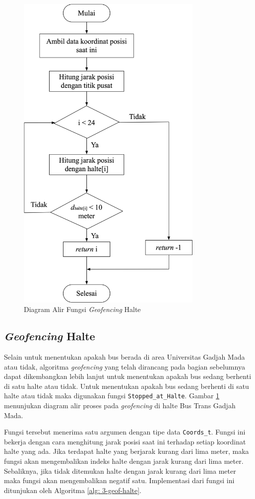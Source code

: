\begin{figure}[H]
	\centering
	\includegraphics[width=9cm]{contents/chapter-3/flowchart-geofencing-halte.png}
	\caption{Diagram Alir Fungsi \textit{Geofencing} Halte}
	\label{Fig: flowchart-geofencing-halte}
\end{figure}

\subsection{\textit{Geofencing} Halte}
Selain untuk menentukan apakah bus berada di area Universitas Gadjah Mada atau tidak, algoritma \textit{geofencing} yang telah dirancang pada bagian sebelumnya dapat dikembangkan lebih lanjut untuk menentukan apakah bus sedang berhenti di satu halte atau tidak. Untuk menentukan apakah bus sedang berhenti di satu halte atau tidak maka digunakan fungsi \texttt{Stopped\_at\_Halte}. Gambar \ref{Fig: flowchart-geofencing-halte} menunjukan diagram alir proses pada \textit{geofencing} di halte Bus Trans Gadjah Mada. 

Fungsi tersebut menerima satu argumen dengan tipe data \texttt{Coords\_t}. Fungsi ini bekerja dengan cara menghitung jarak posisi saat ini terhadap setiap koordinat halte yang ada. Jika terdapat halte yang berjarak kurang dari lima meter, maka fungsi akan mengembalikan indeks halte dengan jarak kurang dari lima meter. Sebaliknya, jika tidak ditemukan halte dengan jarak kurang dari lima meter maka fungsi akan mengembalikan negatif satu. Implementasi dari fungsi ini ditunjukan oleh Algoritma \ref{alg: 3-geof-halte}.

